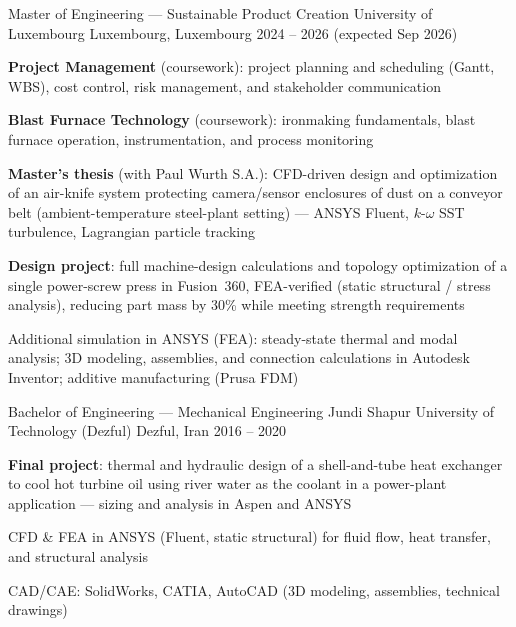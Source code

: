   \begin{cventries}

    \cventry
      {Master of Engineering --- Sustainable Product Creation}
      {University of Luxembourg}
      {Luxembourg, Luxembourg}
      {2024 -- 2026 \enspace(expected Sep 2026)}
      {
        \begin{cvitems}
          \item {\textbf{Project Management} (coursework): project planning and scheduling (Gantt, WBS), cost control, risk management, and stakeholder communication}
          \item {\textbf{Blast Furnace Technology} (coursework): ironmaking fundamentals, blast furnace operation, instrumentation, and process monitoring}
          \item {\textbf{Master's thesis} (with Paul Wurth S.A.): CFD-driven design and optimization of an air-knife system protecting camera/sensor enclosures of dust on a conveyor belt (ambient-temperature steel-plant setting) --- ANSYS Fluent, $k$-$\omega$ SST turbulence, Lagrangian particle tracking}
          \item {\textbf{Design project}: full machine-design calculations and topology optimization of a single power-screw press in Fusion~360, FEA-verified (static structural / stress analysis), reducing part mass by 30\% while meeting strength requirements}
          \item {Additional simulation in ANSYS (FEA): steady-state thermal and modal analysis; 3D modeling, assemblies, and connection calculations in Autodesk Inventor; additive manufacturing (Prusa FDM)}
        \end{cvitems}
      }

    \cventry
      {Bachelor of Engineering --- Mechanical Engineering}
      {Jundi Shapur University of Technology (Dezful)}
      {Dezful, Iran}
      {2016 -- 2020}
      {
        \begin{cvitems}
          \item {\textbf{Final project}: thermal and hydraulic design of a shell-and-tube heat exchanger to cool hot turbine oil using river water as the coolant in a power-plant application --- sizing and analysis in Aspen and ANSYS}
          \item {CFD \& FEA in ANSYS (Fluent, static structural) for fluid flow, heat transfer, and structural analysis}
          \item {CAD/CAE: SolidWorks, CATIA, AutoCAD (3D modeling, assemblies, technical drawings)}
        \end{cvitems}
      }

  \end{cventries}